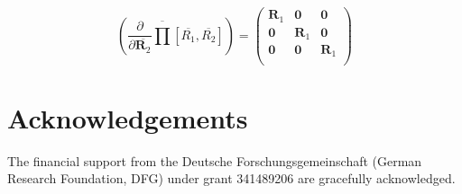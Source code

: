 \documentclass[twocolumn,10pt]{IFTOMM}
\newcommand{\bm}[1]{\boldsymbol{#1}}
\begin{document}
\begin{equation}
\left(\frac{\partial }{\partial \overline{\bm{R}_2}}
\overline{\prod}\left[ \overline{R_1}, \overline{R_2}\right]\right)
=
\begin{pmatrix}
\bm{R}_1 & \bm{0} & \bm{0} \\
\bm{0} & \bm{R}_1 & \bm{0} \\
\bm{0} & \bm{0} & \bm{R}_1  \\
\end{pmatrix}
\end{equation}

\section{Acknowledgements}

The financial support from the Deutsche Forschungsgemeinschaft (German Research Foundation, DFG) under grant 341489206 are gracefully acknowledged.



\end{document}
